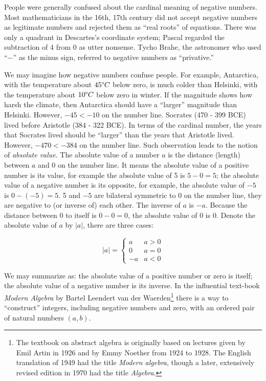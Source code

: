 \documentclass[b5paper]{article}
\begin{document}
People were generally confused about the cardinal meaning of negative numbers. Most mathematicians in the 16th, 17th century did not accept negative numbers as legitimate numbers and rejected them as \enquote{real roots} of equations\cite{MKlein-1972}. There was only a quadrant in Descartes's coordinate system; Pascal regarded the subtraction of 4 from 0 as utter nonsense. Tycho Brahe, the astronomer who used \enquote{$-$} as the minus sign, referred to negative numbers as \enquote{privative.}

We may imagine how negative numbers confuse people. For example, Antarctica, with the temperature about $45\degree C$ below zero, is much colder than Helsinki, with the temperature about $10\degree C$ below zero in winter. If the magnitude shows how harsh the climate, then Antarctica should have a \enquote{larger} magnitude than Helsinki. However, $-45 < -10$ on the number line. Socrates (470 - 399 BCE) lived before Aristotle (384 - 322 BCE). In terms of the cardinal number, the years that Socrates lived should be \enquote{larger} than the years that Aristotle lived. However, $-470 < - 384$ on the number line. Such observation leads to the notion of {\em absolute value}. The absolute value of a number $a$ is the distance (length) between $a$ and 0 on the number line. It means the absolute value of a positive number is its value, for example the absolute value of 5 is $5 - 0 = 5$; the absolute value of a negative number is its opposite, for example, the absolute value of $-5$ is $0 - (-5) = 5$. 5 and $-5$ are bilateral symmetric to 0 on the number line, they are negative to (or inverse of) each other. The inverse of $a$ is $-a$. Because the distance between 0 to itself is $0 - 0 = 0$, the absolute value of 0 is 0. Denote the absolute value of $a$ by $|a|$, there are three cases:

\[
|a| = \begin{cases}
  a & a > 0 \\
  0 & a = 0 \\
  -a & a < 0
\end{cases}
\]

  \label{sec:z-as-pair}
We may summarize as: the absolute value of a positive number or zero is itself; the absolute value of a negative number is its inverse. In the influential text-book \emph{Modern Algebra} by Bartel Leendert van der Waerden\footnote{The textbook on abstract algebra is originally based on lectures given by Emil Artin in 1926 and by Emmy Noether from 1924 to 1928. The English translation of 1949 had the title \emph{Modern algebra}, though a later, extensively revised edition in 1970 had the title \emph{Algebra}.} there is a way to \enquote{construct} integers, including negative numbers and zero, with an ordered pair of natural numbers $(a, b)$.
\end{document}
